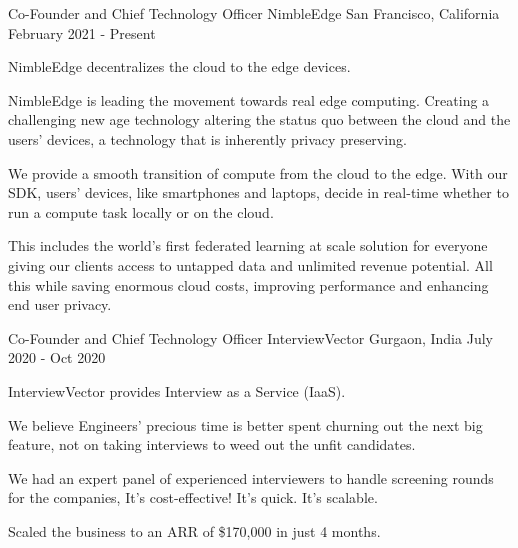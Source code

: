 

\begin{cventries}



  \cventry
    {Co-Founder and Chief Technology Officer} %
    {NimbleEdge} %
    {San Francisco, California} %
    {February 2021 - Present} %
    {
      \begin{cvitems} %
        \item {NimbleEdge decentralizes the cloud to the edge devices.}
        \item {NimbleEdge is leading the movement towards real edge computing. Creating a challenging new age technology altering the status quo between the cloud and the users’ devices, a technology that is inherently privacy preserving.}
        \item {We provide a smooth transition of compute from the cloud to the edge. With our SDK, users’ devices, like smartphones and laptops, decide in real-time whether to run a compute task locally or on the cloud.}
        \item {This includes the world’s first federated learning at scale solution for everyone giving our clients access to untapped data and unlimited revenue potential. All this while saving enormous cloud costs, improving performance and enhancing end user privacy.}
      \end{cvitems}
    }


  \cventry
    {Co-Founder and Chief Technology Officer} %
    {InterviewVector} %
    {Gurgaon, India} %
    {July 2020 - Oct 2020} %
    {
      \begin{cvitems} %
        \item {InterviewVector provides Interview as a Service (IaaS).}
        \item {We believe Engineers' precious time is better spent churning out the next big feature, not on taking interviews to weed out the unfit candidates.}
        \item {We had an expert panel of experienced interviewers to handle screening rounds for the companies, It's cost-effective! It's quick. It's scalable.}
        \item {Scaled the business to an ARR of \$170,000 in just 4 months.}
      \end{cvitems}
    }


\end{cventries}
